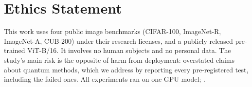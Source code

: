 \section*{Ethics Statement}

This work uses four public image benchmarks (CIFAR-100, ImageNet-R,
ImageNet-A, CUB-200) under their research licenses, and a publicly released
pre-trained ViT-B/16. It involves no human subjects and no personal data.
The study's main risk is the opposite of harm from deployment: overstated
claims about quantum methods, which we address by reporting every
pre-registered test, including the failed ones. All experiments ran on one GPU
model; .
